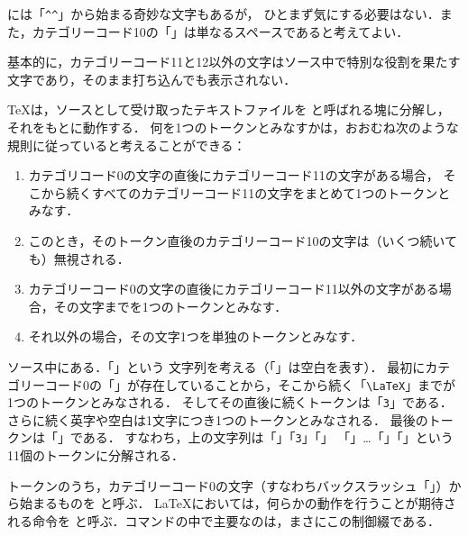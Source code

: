 には「\lstinline|^^|」から始まる奇妙な文字もあるが，
ひとまず気にする必要はない．また，カテゴリーコード10の「\cmd{\textvisiblespace}」は単なるスペースであると考えてよい．

基本的に，カテゴリーコード11と12以外の文字はソース中で特別な役割を果たす文字であり，そのまま打ち込んでも表示されない．

{\TeX}は，ソースとして受け取ったテキストファイルを%
%
と呼ばれる塊に分解し，それをもとに動作する．
何を1つのトークンとみなすかは，おおむね次のような規則に従っていると考えることができる：
\begin{enumerate}
	\item カテゴリコード0の文字の直後にカテゴリーコード11の文字がある場合，
	      そこから続くすべてのカテゴリーコード11の文字をまとめて1つのトークンとみなす．
	\item このとき，そのトークン直後のカテゴリーコード10の文字は（いくつ続いても）無視される．
	\item カテゴリーコード0の文字の直後にカテゴリーコード11以外の文字がある場合，その文字までを1つのトークンとみなす．
	\item それ以外の場合，その文字1つを単独のトークンとみなす．
\end{enumerate}

\begin{Ex} \label{Ex:chap:simplemacro_sec::analysis_subsec::token_token}
	ソース中にある．「」という
	文字列を考える（「\cmd{\textvisiblespace}」は空白を表す）．
	最初にカテゴリーコード0の「\cs{}」が存在していることから，そこから続く「\lstinline|\LaTeX|」までが1つのトークンとみなされる．
	そしてその直後に続くトークンは「\lstinline|3|」である．
	さらに続く英字や空白は1文字につき1つのトークンとみなされる．
	最後のトークンは「」である．
	すなわち，上の文字列は「」「\lstinline|3|」「\cmd{\textvisiblespace}」
	「」…「」「」という11個のトークンに分解される．
\end{Ex}

トークンのうち，カテゴリーコード0の文字（すなわちバックスラッシュ「\cs{}」）から始まるものを%
%
%
と呼ぶ．
{\LaTeX}においては，何らかの動作を行うことが期待される命令を%
%
%
と呼ぶ．コマンドの中で主要なのは，まさにこの制御綴である．

